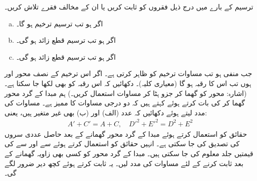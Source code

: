 ترسیم  کے بارے میں درج ذیل فقروں کو ثابت کریں یا ان کے مخالف فقرے تلاش کریں۔
\begin{enumerate}[a.]
\item
اگر  ہو تب ترسیم ترخیم ہو گا۔
\item
اگر  ہو تب ترسیم قطع زائد ہو گی۔
\item
اگر  ہو تب ترسیم قطع زائد ہو گی۔
\end{enumerate}
جب  منفی ہو تب مساوات   ترخیم کو ظاہر کرتی ہے۔ اگر اس ترخیم کے نصف محور  اور  ہوں تب اس کا رقبہ  ہو گا (معیاری کلیہ)۔ دکھائیں کہ اس رقبہ کو  بھی لکھا جا سکتا ہے۔ (اشارہ: محور کو گھما کر جزو  ہٹا کر مساوات  استعمال کریں۔)
ہم مبدا کے گرد محور گھما کر  کی بات کرتے ہوئے کہتے ہیں کہ دو درجی مساوات کا ممیز  ہے۔ مساوات  کی مدد لیتے ہوئے دکھائیں کہ عدد (الف)  اور (ب)  بھی غیر متغیر ہیں، یعنی:
\begin{align*}
A'+C'=A+C,\quad D'^2+E'^2=D^2+E^2
\end{align*}
 حقائق کو استعمال کرتے ہوئے مبدا کے گرد محور گھمانے کے بعد حاصل عددی سروں کی تصدیق کی جا سکتی ہے۔ انہیں حقائق کو استعمال کرتے ہوئے  سے  اور  سے  کی قیمتیں جلد معلوم کی جا سکتی ہیں۔
مبدا کے گرد محور کو کسی بھی زاویہ گھمانے کے بعد  ثابت کرنے کے لئے مساوات  کی مدد لیں۔ یہ ثابت کرتے ہوئے کچھ دیر ضرور لگے گی۔

